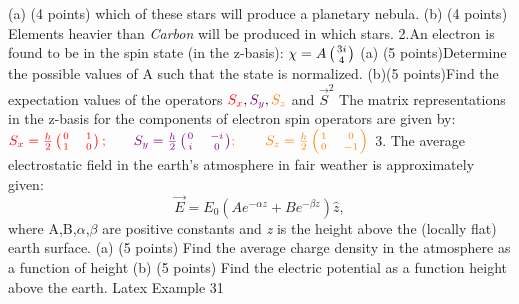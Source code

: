 \documentclass[12pt]{article}
\begin{document}


(a) (4 points) which of these stars will produce a planetary nebula. 
\vskip0.3in
(b) (4 points) Elements heavier than \textit{Carbon} will be produced in which stars.
\vskip0.3in
\-\hspace{-1cm}2.\hspace{0.5em}An electron is found to be in the spin state (in the z-basis): $\chi = A\left(\begin{matrix} 3i \atop 4 \end{matrix}\right)$
\vskip0.3in
\-\hspace{-0.5cm}(a)\hspace{0.5em} (5 points)\hspace{0.2em}Determine the possible values of A such that the state is normalized.
\vskip0.3in
\-\hspace{-0.5cm}(b)\hspace{0.5em}(5 points)\hspace{0.2em}Find the expectation values of the operators 
${\color{red}S_x},{\color{violet}S_y},{\color{orange}S_z}$\hspace{0.01em} and \hspace{0.01em} $\vec{S}^2$
\vskip0.2in
\noindent\-\hspace{1cm}The matrix representations in the z-basis for the components of electron spin operators are
given by:
\vskip0.2in
${{\color{red}S_x = \frac{h}{2}\left({0 \atop 1} {\hspace{1em}1 \atop\hspace{1em} 0}\right);\hspace{2em}}}  {\color{violet}S_y=\frac{h}{2}\left({0 \atop i} {\hspace{1em}-i \atop\hspace{1em} 0}\right)}{\color{orange}; \hspace{2em} S_z = \frac{h}{2}\left({1 \atop 0} {\hspace{1em}0 \atop \hspace{1em}-1}\right)}$
\vskip0.1in
\-\hspace{-1cm}3. The average electrostatic field in the earth’s atmosphere in fair weather is approximately given:
\begin{equation}
\vec{E} = E_0 \left(Ae^{-\alpha z} + Be^{-\beta z}\right)\hat{z},
\end{equation}
   where A,B,$\alpha$,$\beta$ are positive constants and\textit{ z} is the height above the (locally flat) earth surface. 
\vskip0.2in
\-\hspace{-0.3cm}(a) (5 points) Find the average charge density in the atmosphere as a function of height
\vskip0.3in
\-\hspace{-0.3cm}(b) (5 points) Find the electric potential as a function height above the earth.
\vskip0.8in
Latex Example 31
\vskip0.3in


\pagestyle{empty} 
\end{document}
